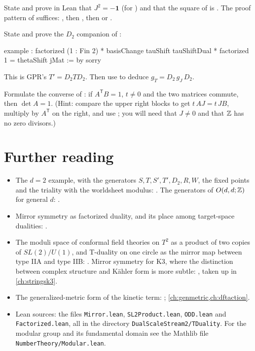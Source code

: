 \begin{exercise}
State and prove in Lean that $J^2=-\mathbf 1$ (for ) and that the square of
 is \lean{!![1, 2; 0, 1]}. The proof pattern of
 suffices: , then , then 
or .
\end{exercise}

\begin{exercise}\label{ex:torus2:lean2}
State and prove the $D_2$ companion of :
\begin{leancode}
example : factorized (1 : Fin 2) * basisChange tauShift tauShiftDual * factorized 1
    = thetaShift jMat := by sorry
\end{leancode}
This is GPR's $T'=D_2TD_2$. Then use  to deduce
$g_T=D_2\,g_J\,D_2$.
\end{exercise}

\begin{exercise}
Formulate the converse of : if $A^{\mathsf T}B=1$,
$t\neq0$ and the two matrices commute, then $\det A=1$. (Hint: compare the upper right
blocks to get $t\,AJ=t\,JB$, multiply by $A^{\mathsf T}$ on the right, and use
; you will need that $J\ne0$ and that $\mathbb{Z}$ has no zero
divisors.)
\end{exercise}

\section*{Further reading}
\begin{itemize}[nosep,leftmargin=*]
\item The $d=2$ example, with the generators $S,T,S',T',D_2,R,W$, the fixed points and the
triality with the worldsheet modulus: . The generators of
$O(d,d;\mathbb{Z})$ for general $d$: .
\item Mirror symmetry as factorized duality, and its place among target-space dualities:
.
\item The moduli space of conformal field theories on $T^2$ as a product of two copies of
$SL(2)/U(1)$, and T-duality on one circle as the mirror map between type IIA and type IIB:
. Mirror symmetry for K3, where the
distinction between complex structure and K\"ahler form is more subtle:
, taken up in \cref{ch:stringsk3}.
\item The generalized-metric form of the kinetic term: ;
\cref{ch:genmetric,ch:dftaction}.
\item Lean sources: the files \texttt{Mirror.lean}, \texttt{SL2Product.lean},
\texttt{ODD.lean} and \texttt{Factorized.lean}, all in the directory
\texttt{DualScaleStream2/TDuality}. For the modular group and its fundamental domain see the Mathlib
file \texttt{NumberTheory/Modular.lean}.
\end{itemize}

